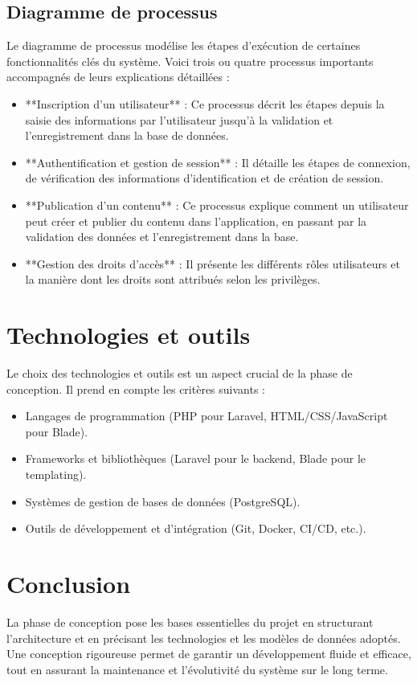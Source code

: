 \subsection{Diagramme de processus}
Le diagramme de processus modélise les étapes d'exécution de certaines fonctionnalités clés du système. Voici trois ou quatre processus importants accompagnés de leurs explications détaillées :
\begin{itemize}
    \item **Inscription d'un utilisateur** : Ce processus décrit les étapes depuis la saisie des informations par l'utilisateur jusqu'à la validation et l'enregistrement dans la base de données.
    \item **Authentification et gestion de session** : Il détaille les étapes de connexion, de vérification des informations d'identification et de création de session.
    \item **Publication d'un contenu** : Ce processus explique comment un utilisateur peut créer et publier du contenu dans l'application, en passant par la validation des données et l'enregistrement dans la base.
    \item **Gestion des droits d'accès** : Il présente les différents rôles utilisateurs et la manière dont les droits sont attribués selon les privilèges.
\end{itemize}

\section{Technologies et outils}
Le choix des technologies et outils est un aspect crucial de la phase de conception. Il prend en compte les critères suivants :
\begin{itemize}
    \item Langages de programmation (PHP pour Laravel, HTML/CSS/JavaScript pour Blade).
    \item Frameworks et bibliothèques (Laravel pour le backend, Blade pour le templating).
    \item Systèmes de gestion de bases de données (PostgreSQL).
    \item Outils de développement et d’intégration (Git, Docker, CI/CD, etc.).
\end{itemize}

\section{Conclusion}
La phase de conception pose les bases essentielles du projet en structurant l'architecture et en précisant les technologies et les modèles de données adoptés. Une conception rigoureuse permet de garantir un développement fluide et efficace, tout en assurant la maintenance et l'évolutivité du système sur le long terme.

